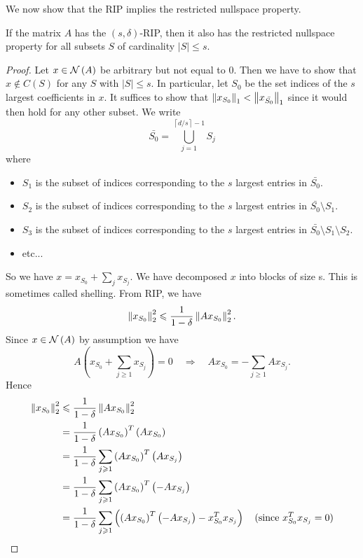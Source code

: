 \documentclass[11pt]{article}
\begin{document}
We now show that the RIP implies the restricted nullspace property.

\begin{theorem}
    If the matrix \(A\) has the \((s,\delta)\)-RIP, then it also has the restricted nullspace property for all subsets \(S\) of cardinality \(|S| \leqslant s\).
\end{theorem}

\begin{proof}
Let \(x \in \mathcal N\left(A\right)\) be arbitrary but not equal to 0. Then we have to show that \(x \notin C(S)\) for any \(S\) with \(|S| \leqslant s\). In particular, let \(S_{0}\) be the set indices of the \(s\) largest coefficients in \(x\). It suffices to show that \(\left\|x_{S_0}\right\|_1<\left\|x_{\bar{S_0}}\right\|_1\) since it would then hold for any other subset.
We write
\[\bar{S_0}=\bigcup_{j=1}^{\left\lceil d/s\right\rceil-1} S_{j}\]
where
\begin{itemize}
    \item \(S_{1}\) is the subset of indices corresponding to the \(s\) largest entries in \(\bar{S_0}\).
    \item \(S_{2}\) is the subset of indices corresponding to the \(s\) largest entries in \(\bar{S_0} \setminus S_{1}\).
    \item \(S_{3}\) is the subset of indices corresponding to the \(s\) largest entries in \(\bar{S_0} \setminus S_{1} \setminus S_{2}\).
    \item etc...
\end{itemize}
So we have \(x=x_{S_{0}}+\sum_{j} x_{S_{j}}\). We have decomposed \(x\) into blocks of size s. This is sometimes called shelling. From RIP, we have
\[\left\|x_{S_0}\right\|_2^2\leqslant\frac{1}{1-\delta}\left\|Ax_{S_0}\right\|_2^2.\]
Since \(x \in \mathcal N\left(A\right)\) by assumption we have
\[A\left(x_{S_{0}}+\sum_{j \geqslant 1} x_{S_{j}}\right)=0\quad\Rightarrow\quad A x_{S_{0}}=-\sum_{j \geqslant 1} A x_{S_{j}}.\]
Hence
\[\begin{aligned}
    \norm{x_{S_0}}_2^2
    &\leqslant \frac{1}{1-\delta}\norm{Ax_{S_0}}_2^2\\
    &= \frac{1}{1-\delta}\left(Ax_{S_0}\right)^T\left(Ax_{S_0}\right)\\
    &= \frac{1}{1-\delta}\sum_{j\geqslant 1}\left(Ax_{S_0}\right)^T\left(Ax_{S_j}\right)\\
    &= \frac{1}{1-\delta}\sum_{j\geqslant 1}\left(Ax_{S_0}\right)^T\left(-Ax_{S_j}\right)\\
    &= \frac{1}{1-\delta}\sum_{j\geqslant 1}\left(\left(Ax_{S_0}\right)^T\left(-Ax_{S_j}\right)-x_{S_0}^Tx_{S_j}\right)\quad\textnormal{(since }x_{S_0}^Tx_{S_j}=0\textnormal{)}\\

\end{aligned}\]
\end{proof}
\end{document}
